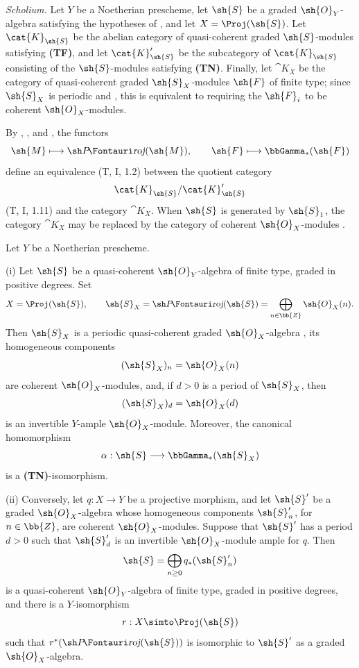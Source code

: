 \begin{env}[2.3.3]
\label{III.2.3.3}
\emph{Scholium.}
Let $Y$ be a Noetherian prescheme, let $\sh{S}$ be a graded $\sh{O}_Y$-algebra satisfying the hypotheses of , and let $X=\Proj(\sh{S})$.
Let $\cat{K}_{\sh{S}}$ be the abelian category of quasi-coherent graded $\sh{S}$-modules satisfying \textbf{(TF)}, and let $\cat{K}'_{\sh{S}}$ be the subcategory of $\cat{K}_{\sh{S}}$ consisting of the $\sh{S}$-modules satisfying \textbf{(TN)}.
Finally, let $\cat{K}_X$ be the category of quasi-coherent graded $\sh{S}_X$-modules $\sh{F}$ of finite type; since $\sh{S}_X$ is periodic  and , this is equivalent to requiring the $\sh{F}_i$ to be coherent $\sh{O}_X$-modules.

By , , and , the functors
\[
  \sh{M}\longmapsto\shProj(\sh{M}),
  \qquad
  \sh{F}\longmapsto\bbGamma_*(\sh{F})
\]
define an equivalence (T, I, 1.2) between the quotient category
\[
  \cat{K}_{\sh{S}}/\cat{K}'_{\sh{S}}
\]
(T, I, 1.11) and the category $\cat{K}_X$.
When $\sh{S}$ is generated by $\sh{S}_1$, the category $\cat{K}_X$ may be replaced by the category of coherent $\sh{O}_X$-modules .
\end{env}

\begin{proposition}[2.3.4]
\label{III.2.3.4}
Let $Y$ be a Noetherian prescheme.

(i) Let $\sh{S}$ be a quasi-coherent $\sh{O}_Y$-algebra of finite type, graded in positive degrees.
Set
\[
  X=\Proj(\sh{S}),\qquad
  \sh{S}_X=\shProj(\sh{S})
  =\bigoplus_{n\in\bb{Z}}\sh{O}_X(n).
\]
Then $\sh{S}_X$ is a periodic quasi-coherent graded $\sh{O}_X$-algebra , its homogeneous components
\[
  (\sh{S}_X)_n=\sh{O}_X(n)
\]
are coherent $\sh{O}_X$-modules, and, if $d>0$ is a period of $\sh{S}_X$, then
\[
  (\sh{S}_X)_d=\sh{O}_X(d)
\]
is an invertible $Y$-ample $\sh{O}_X$-module.
Moreover, the canonical homomorphism
\[
  \alpha:\sh{S}\longrightarrow\bbGamma_*(\sh{S}_X)
\]
is a \textbf{(TN)}-isomorphism.

(ii) Conversely, let $q:X\to Y$ be a projective morphism, and let $\sh{S}'$ be a graded $\sh{O}_X$-algebra whose homogeneous components $\sh{S}'_n$, for $n\in\bb{Z}$, are coherent $\sh{O}_X$-modules.
Suppose that $\sh{S}'$ has a period $d>0$ such that $\sh{S}'_d$ is an invertible $\sh{O}_X$-module ample for $q$.
Then
\[
  \sh{S}=\bigoplus_{n\geq0}q_*(\sh{S}'_n)
\]
is a quasi-coherent $\sh{O}_Y$-algebra of finite type, graded in positive degrees, and there is a $Y$-isomorphism
\[
  r:X\simto\Proj(\sh{S})
\]
such that $r^*(\shProj(\sh{S}))$ is isomorphic to $\sh{S}'$ as a graded $\sh{O}_X$-algebra.
\end{proposition}

